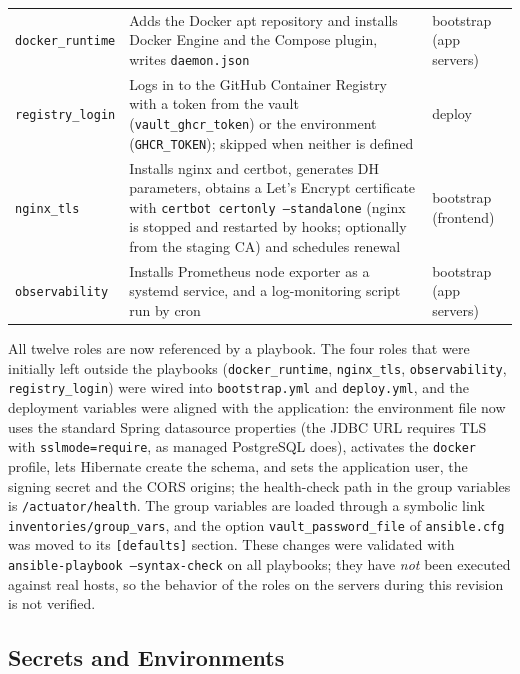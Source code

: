 \begin{table}[tb]
\begin{tabularx}{\linewidth}{@{}l X l@{}}
\texttt{docker\_runtime} & Adds the Docker apt repository and installs Docker Engine and the Compose plugin, writes \texttt{daemon.json} & bootstrap (app servers) \\
\texttt{registry\_login} & Logs in to the GitHub Container Registry with a token from the vault (\texttt{vault\_ghcr\_token}) or the environment (\texttt{GHCR\_TOKEN}); skipped when neither is defined & deploy \\
\texttt{nginx\_tls} & Installs nginx and certbot, generates DH parameters, obtains a Let's Encrypt certificate with \texttt{certbot certonly --standalone} (nginx is stopped and restarted by hooks; optionally from the staging CA) and schedules renewal & bootstrap (frontend) \\
\texttt{observability} & Installs Prometheus node exporter as a systemd service, and a log-monitoring script run by cron & bootstrap (app servers) \\
\bottomrule
\end{tabularx}
\end{table}

All twelve roles are now referenced by a playbook. The four roles that were initially left outside the playbooks (\texttt{docker\_runtime}, \texttt{nginx\_tls}, \texttt{observability}, \texttt{registry\_login}) were wired into \texttt{bootstrap.yml} and \texttt{deploy.yml}, and the deployment variables were aligned with the application: the environment file now uses the standard Spring datasource properties (the JDBC URL requires TLS with \texttt{sslmode=require}, as managed PostgreSQL does), activates the \texttt{docker} profile, lets Hibernate create the schema, and sets the application user, the signing secret and the CORS origins; the health-check path in the group variables is \texttt{/actuator/health}. The group variables are loaded through a symbolic link \texttt{inventories/group\_vars}, and the option \texttt{vault\_password\_file} of \texttt{ansible.cfg} was moved to its \texttt{[defaults]} section. These changes were validated with \texttt{ansible-playbook --syntax-check} on all playbooks; they have \emph{not} been executed against real hosts, so the behavior of the roles on the servers during this revision is not verified.

\subsection{Secrets and Environments}

